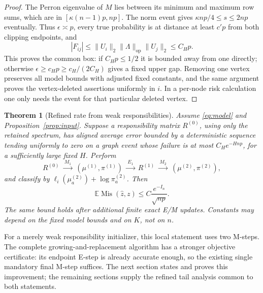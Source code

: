 \documentclass[11pt]{article}
\newtheorem{theorem}{Theorem}
\newcommand{\E}{\mathbb E}
\newcommand{\op}{\mathrm{op}}
\newcommand{\Mis}{\operatorname{Mis}}
\begin{document}
\begin{proof}
The Perron eigenvalue of $M$ lies between its minimum and maximum row sums, which are in $[\kappa(n-1)p,np]$. The norm event gives $\kappa np/4\le s\le2np$ eventually. Thus $\epsilon\asymp p$, every true probability is at distance at least $c'p$ from both clipping endpoints, and
\[
 |F_{ij}|\le\|U_i\|_2\|\Lambda\|_\op\|U_j\|_2\le C_Hp.
\]
This proves the common box: if $C_Hp\le1/2$ it is bounded away from one directly; otherwise $\epsilon\ge c_Hp\ge c_H/(2C_H)$ gives a fixed upper gap. Removing one vertex preserves all model bounds with adjusted fixed constants, and the same argument proves the vertex-deleted assertions uniformly in $i$. In a per-node risk calculation one only needs the event for that particular deleted vertex.
\end{proof}

\begin{theorem}[Refined rate from weak responsibilities]\label{thm:sharp}
Assume \eqref{eq:model} and Proposition~\ref{prop:input}. Suppose a responsibility matrix $R^{(0)}$, using only the retained spectrum, has aligned average error bounded by a deterministic sequence tending uniformly to zero on a graph event whose failure is at most $C_H e^{-Hnp}$, for a sufficiently large fixed $H$. Perform
\[
 R^{(0)}\ \xrightarrow{\ M_1\ }\ (\mu^{(1)},\pi^{(1)})
 \ \xrightarrow{\ E_1\ }\ R^{(1)}
 \ \xrightarrow{\ M_2\ }\ (\mu^{(2)},\pi^{(2)}),
\]
and classify by $\ell_i(\mu^{(2)}_a)+\log\pi^{(2)}_a$. Then
\begin{equation}\label{eq:sharp-target}
 \E\Mis(\widehat z,z)\le C\frac{e^{-I_n}}{\sqrt{np}}.
\end{equation}
The same bound holds after additional finite exact E/M updates. Constants may depend on the fixed model bounds and on $K$, not on $n$.
\end{theorem}

For a merely weak responsibility initializer, this local statement uses two M-steps. The complete growing-and-replacement algorithm has a stronger objective certificate: its endpoint E-step is already accurate enough, so the existing single mandatory final M-step suffices. The next section states and proves this improvement; the remaining sections supply the refined tail analysis common to both statements.
\end{document}
